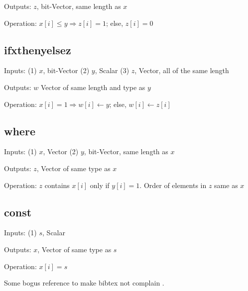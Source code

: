 \item Outputs: \(z\), bit-Vector, same length as \(x\)

\item Operation: \(x[i] \leq y \Rightarrow z[i] = 1\); else, \(z[i] = 0\)
\ei


\subsection{ifxthenyelsez}
\label{ifxthenyelsez}
\bi
\item Inputs: (1) \(x\), bit-Vector (2) \(y\), Scalar (3) \(z\), Vector, all of
the same length

\item Outputs: \(w\) Vector of same length and type as \(y\)

\item Operation: \(x[i] = 1 \Rightarrow w[i] \leftarrow y\); else, \(w[i]
\leftarrow z[i]\)

\ei


\subsection{where}
\label{where}
\bi
\item Inputs: (1) \(x\), Vector  (2) \(y\), bit-Vector, same length as \(x\)

\item Outputs: \(z\), Vector of same type as \(x\)

\item Operation: \(z\) contains \(x[i]\) only if
\(y[i] = 1\). Order of elements in  \(z\) same as \(x\)

\ei

\subsection{const}
\label{const}
\bi
\item Inputs: (1) \(s\), Scalar 

\item Outputs: \(x\), Vector of same type as \(s\)

\item Operation: \(x[i] = s\)

\ei

\appendix
Some bogus reference to make bibtex not complain \cite{Hastie2009}.


